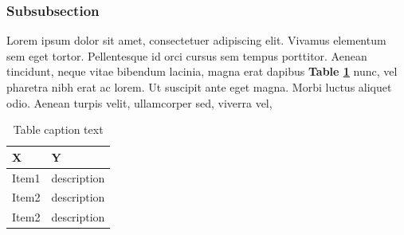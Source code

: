 \subsubsection{Subsubsection}
Lorem ipsum dolor sit amet, consectetuer adipiscing elit. Vivamus elementum sem eget tortor. Pellentesque id orci cursus sem tempus porttitor. Aenean tincidunt, neque vitae bibendum lacinia, magna erat dapibus \textbf{Table \ref{tab:table}} nunc, vel pharetra nibh erat ac lorem. Ut suscipit ante eget magna. Morbi luctus aliquet odio. Aenean turpis velit, ullamcorper sed, viverra vel, 

 \begin{table} [t] 
\centering
\begin{small}
\caption{Table caption text}
\label{tab:table}
\setlength{\tabcolsep}{1em}
\begin{tabular}{ l| p{8cm}}
\hline
 \textbf{X} & \textbf{ Y} \\
\hline
 \hline	
 Item1 & description\\
 \hline
  Item2 & description  \\
 \hline
  Item2 & description \\
 \hline
\end{tabular}
\end{small}
\end{table}



